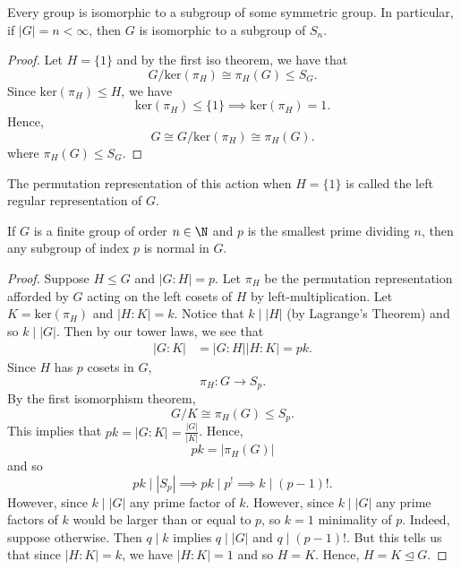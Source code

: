 \begin{theorem}
   Every group is isomorphic to a subgroup of some symmetric group. In particular, if \( | G  |  = n < \infty \), then \( G  \) is isomorphic to a subgroup of \( {S}_{n} \). 
\end{theorem}
\begin{proof}
Let \( H  = \{  1  \}  \) and by the first iso theorem, we have that 
\[  G / \text{ker}({\pi}_{H}) \cong {\pi}_{H}(G) \leq {S}_{G}. \]
Since \( \text{ker}({\pi}_{H}) \leq H  \), we have 
\[  \text{ker}({\pi}_{H}) \leq \{  1 \} \implies  \text{ker}({\pi}_{H}) = 1  .  \]
Hence, 
\[   G \cong  G / \text{ker}({\pi}_{H}) \cong {\pi}_{H}(G).  \]
where \( {\pi}_{H}(G) \leq {S}_{G} \).
\end{proof}

The permutation representation of this action when \( H = \{  1  \}  \) is called the left regular representation of \( G  \). 

\begin{corollary}
   If \( G  \) is a finite group of order \( n  \in \N  \) and \( p  \) is the smallest prime dividing \( n  \), then any subgroup of index \( p  \) is normal in \( G  \). 
\end{corollary}
\begin{proof}
Suppose \( H \leq G  \) and \( | G : H  |  = p  \). Let \( {\pi}_{H}  \) be the permutation representation afforded by \( G  \) acting on the left cosets of \( H  \) by left-multiplication. Let \( K = \text{ker}({\pi}_{H}) \) and \( | H : K  |  = k  \). Notice that \( k \mid | H  |  \) (by Lagrange's Theorem) and so \( k \mid | G  |  \). Then by our tower laws, we see that
\begin{align*}
    | G : K  | &=| G : H  | | H : K  | = p k.  
\end{align*}
Since \( H  \) has \( p  \) cosets in \( G  \), 
\[  \pi_{H} : G \to {S}_{p}. \]
By the first isomorphism theorem, 
\[  G / K \cong {\pi}_{H}(G) \leq {S}_{p}. \]
This implies that \( pk = | G :  K | = \frac{  | G  |  }{ | K  |  }    \). Hence, 
\[  pk  = | {\pi}_{H}(G) |  \]
and so 
\[ p k \mid | {S}_{p} | \implies pk \mid p^{!} \implies k \mid (p-1)!. \]
However, since \( k \mid | G  |  \) any prime factor of \( k  \).  However, since \( k \mid | G  |  \) any prime factors of \( k  \) would be larger than or equal to \( p  \), so \( k = 1  \) minimality of \( p  \). Indeed, suppose otherwise. Then \( q \mid k   \) implies \( q \mid | G  |  \) and \( q \mid (p-1)! \). But this tells us that since \( | H : K  |  = k  \), we have \( | H : K  |  = 1  \) and so \( H = K  \). Hence, \( H = K \trianglelefteq G  \).
\end{proof}

